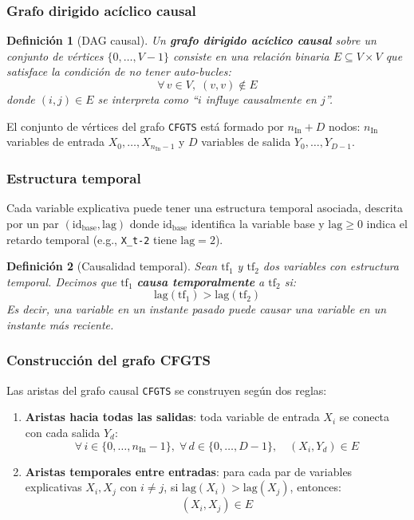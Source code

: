 \documentclass[12pt]{report} %
\newtheorem{definition}{Definición}
\begin{document}
\subsubsection{Grafo dirigido acíclico causal}

\begin{definition}[DAG causal]
    Un \textbf{grafo dirigido acíclico causal} sobre un conjunto de vértices $\{0, \ldots, V-1\}$ consiste en una relación binaria $E \subseteq V \times V$ que satisface la condición de no tener auto-bucles:
    $$\forall\, v \in V,\; (v, v) \notin E$$
    donde $(i, j) \in E$ se interpreta como ``$i$ influye causalmente en $j$''.
\end{definition}

El conjunto de vértices del grafo \texttt{CFGTS} está formado por $n_{\text{In}} + D$ nodos: $n_{\text{In}}$ variables de entrada $X_0, \ldots, X_{n_{\text{In}}-1}$ y $D$ variables de salida $Y_0, \ldots, Y_{D-1}$.

\subsubsection{Estructura temporal}

Cada variable explicativa puede tener una estructura temporal asociada, descrita por un par $(\text{id}_{\text{base}}, \text{lag})$ donde $\text{id}_{\text{base}}$ identifica la variable base y $\text{lag} \geq 0$ indica el retardo temporal (e.g., \texttt{X\_t-2} tiene $\text{lag} = 2$).

\begin{definition}[Causalidad temporal]
    Sean $\text{tf}_1$ y $\text{tf}_2$ dos variables con estructura temporal. Decimos que $\text{tf}_1$ \textbf{causa temporalmente} a $\text{tf}_2$ si:
    $$\text{lag}(\text{tf}_1) > \text{lag}(\text{tf}_2)$$
    Es decir, una variable en un instante pasado puede causar una variable en un instante más reciente.
\end{definition}

\subsubsection{Construcción del grafo CFGTS}

Las aristas del grafo causal \texttt{CFGTS} se construyen según dos reglas:
\begin{enumerate}
    \item \textbf{Aristas hacia todas las salidas}: toda variable de entrada $X_i$ se conecta con cada salida $Y_d$:
          $$\forall\, i \in \{0, \ldots, n_{\text{In}}-1\},\; \forall\, d \in \{0, \ldots, D-1\},\quad (X_i, Y_d) \in E$$
    \item \textbf{Aristas temporales entre entradas}: para cada par de variables explicativas $X_i, X_j$ con $i \neq j$, si $\text{lag}(X_i) > \text{lag}(X_j)$, entonces:
          $$(X_i, X_j) \in E$$
\end{enumerate}
\end{document}
